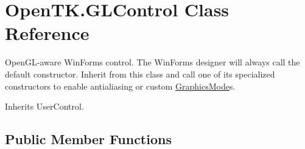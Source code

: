 \hypertarget{class_open_t_k_1_1_g_l_control}{\section{Open\-T\-K.\-G\-L\-Control Class Reference}
\label{class_open_t_k_1_1_g_l_control}
}


Open\-G\-L-\/aware Win\-Forms control. The Win\-Forms designer will always call the default constructor. Inherit from this class and call one of its specialized constructors to enable antialiasing or custom \hyperlink{class_open_t_k_1_1_g_l_control_a09e08e21b3fd710f8b2b310441e414d4}{Graphics\-Mode}s.  




Inherits User\-Control.

\subsection*{Public Member Functions}
